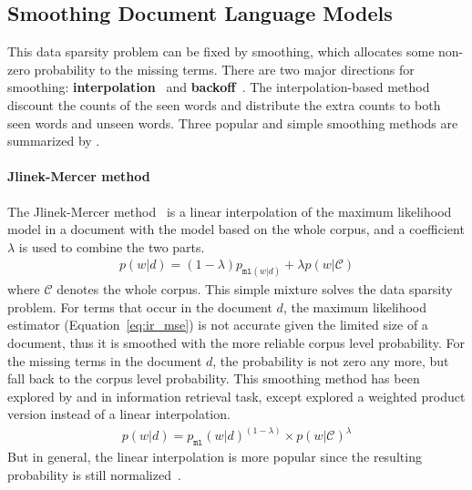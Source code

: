 \subsection{Smoothing Document Language Models}


This data sparsity problem can be fixed by smoothing, which allocates some non-zero probability to the missing terms. There are two major directions for smoothing: \textbf{interpolation}~\citep{Jelinek-1980,mackay95dirichlet,Ney-1994,PonteCroft,zhai-01} and \textbf{backoff}~\citep{katz-87,song-99}. The interpolation-based method discount the counts of the seen words and distribute the extra counts to both seen words and unseen words. Three popular and simple smoothing methods are summarized by \cite{zhai-01}.

\paragraph{Jlinek-Mercer method}

The Jlinek-Mercer method~\cite{Jelinek-1980} is a linear interpolation of the maximum likelihood model in a document with the model based on the whole corpus, and a coefficient $\lambda$ is used to combine the two parts.
\begin{align}
p(w|d) = (1 - \lambda) p_{\texttt{ml}(w|d)} + \lambda p(w|\mathcal{C})
\end{align}
where $\mathcal{C}$ denotes the whole corpus. This simple mixture solves the data sparsity problem. For terms that occur in the document $d$, the maximum likelihood estimator (Equation~\ref{eq:ir_mse}) is not accurate given the limited size of a document, thus it is smoothed with the more reliable corpus level probability. For the missing terms in the document $d$, the probability is not zero any more, but fall back to the corpus level probability. This smoothing method has been explored by \cite{PonteCroft} and \cite{song-99} in information retrieval task, except \cite{PonteCroft} explored a weighted product version instead of a linear interpolation.
\begin{align}
p(w|d) = p_{\texttt{ml}}(w|d)^{(1 - \lambda) } \times p(w|\mathcal{C})^{\lambda}
\label{eq:lm-jr}
\end{align}
But in general, the linear interpolation is more popular since the resulting probability is still normalized~\citep{song-99}.

